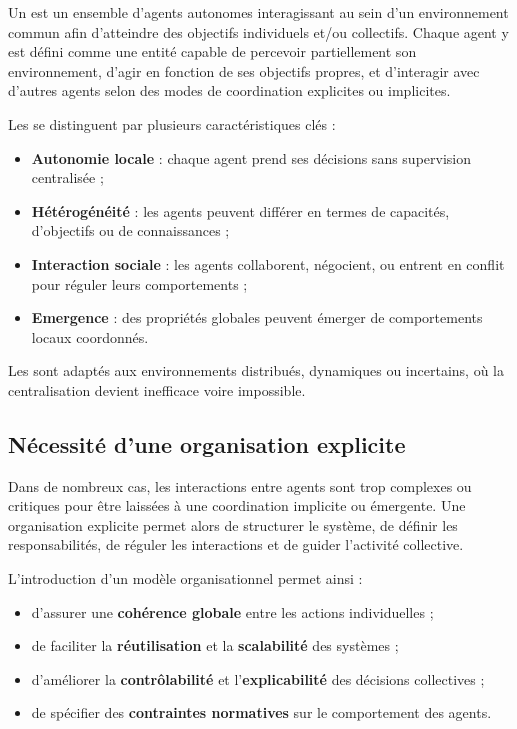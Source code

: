 Un  est un ensemble d'agents autonomes interagissant au sein d'un environnement commun afin d'atteindre des objectifs individuels et/ou collectifs. Chaque agent y est défini comme une entité capable de percevoir partiellement son environnement, d'agir en fonction de ses objectifs propres, et d'interagir avec d'autres agents selon des modes de coordination explicites ou implicites.

Les  se distinguent par plusieurs caractéristiques clés : 
\begin{itemize}
    \item \textbf{Autonomie locale} : chaque agent prend ses décisions sans supervision centralisée ;
    \item \textbf{Hétérogénéité} : les agents peuvent différer en termes de capacités, d'objectifs ou de connaissances ;
    \item \textbf{Interaction sociale} : les agents collaborent, négocient, ou entrent en conflit pour réguler leurs comportements ;
    \item \textbf{Emergence} : des propriétés globales peuvent émerger de comportements locaux coordonnés.
\end{itemize}

Les  sont adaptés aux environnements distribués, dynamiques ou incertains, où la centralisation devient inefficace voire impossible.

\subsection{Nécessité d'une organisation explicite}

Dans de nombreux cas, les interactions entre agents sont trop complexes ou critiques pour être laissées à une coordination implicite ou émergente. Une organisation explicite permet alors de structurer le système, de définir les responsabilités, de réguler les interactions et de guider l'activité collective. 

L'introduction d'un modèle organisationnel permet ainsi :
\begin{itemize}
    \item d'assurer une \textbf{cohérence globale} entre les actions individuelles ;
    \item de faciliter la \textbf{réutilisation} et la \textbf{scalabilité} des systèmes ;
    \item d'améliorer la \textbf{contrôlabilité} et l'\textbf{explicabilité} des décisions collectives ;
    \item de spécifier des \textbf{contraintes normatives} sur le comportement des agents.
\end{itemize}

